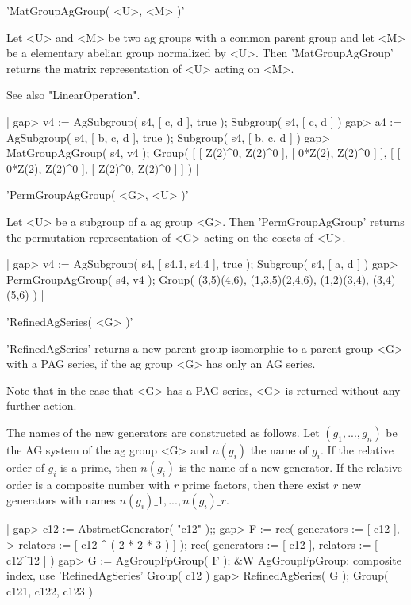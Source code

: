 
'MatGroupAgGroup( <U>, <M> )'

Let <U> and <M> be two ag  groups with a common  parent group and let <M>
be a elementary abelian group  normalized by <U>.  Then 'MatGroupAgGroup'
returns the matrix representation of <U> acting on <M>.

See also "LinearOperation".

|    gap> v4 := AgSubgroup( s4, [ c, d ], true );
    Subgroup( s4, [ c, d ] )
    gap> a4 := AgSubgroup( s4, [ b, c, d ], true );
    Subgroup( s4, [ b, c, d ] )
    gap> MatGroupAgGroup( s4, v4 );
    Group( [ [ Z(2)^0, Z(2)^0 ], [ 0*Z(2), Z(2)^0 ] ],
    [ [ 0*Z(2), Z(2)^0 ], [ Z(2)^0, Z(2)^0 ] ] ) |


'PermGroupAgGroup( <G>, <U> )'

Let <U> be a subgroup of a ag group <G>.  Then 'PermGroupAgGroup' returns
the permutation representation of <G> acting on the cosets of <U>.

|    gap> v4 := AgSubgroup( s4, [ s4.1, s4.4 ], true );
    Subgroup( s4, [ a, d ] )
    gap> PermGroupAgGroup( s4, v4 );
    Group( (3,5)(4,6), (1,3,5)(2,4,6), (1,2)(3,4), (3,4)(5,6) ) |


'RefinedAgSeries( <G> )'

'RefinedAgSeries' returns a new parent group isomorphic to a parent group
<G> with a PAG series, if the ag group <G> has  only an  AG series.

Note that in the case that <G> has a PAG series,  <G> is returned without
any further action.

The  names  of  the new generators   are    constructed as follows.   Let
$(g_1,..., g_n)$  be the AG system of the  ag group  <G> and $n(g_i)$ the
name of $g_i$.  If the relative order of $g_i$ is a  prime, then $n(g_i)$
is the name  of a new generator.  If  the relative  order is a  composite
number with $r$ prime factors, then  there exist $r$ new  generators with
names $n(g_i)\_1, ..., n(g_i)\_r$.

|    gap> c12 := AbstractGenerator( "c12" );;
    gap> F := rec( generators := [ c12 ],
    >              relators   := [ c12 ^ ( 2 * 2 * 3 ) ] );
    rec(
      generators := [ c12 ],
      relators := [ c12^12 ] )
    gap> G := AgGroupFpGroup( F );
    &W  AgGroupFpGroup: composite index, use 'RefinedAgSeries'
    Group( c12 )
    gap> RefinedAgSeries( G );
    Group( c121, c122, c123 ) |


